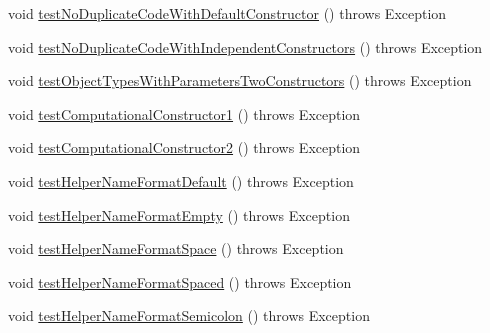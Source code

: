 \begin{DoxyCompactItemize}
\item 
void \hyperlink{classedu_1_1illinois_1_1canistelCassabanana_1_1tests_1_1RemoveDuplicateCodeInConstructorsRefactoringTests_ab173b5c78a3860d95f4ab97fdc0fef49}{testNoDuplicateCodeWithDefaultConstructor} ()  throws Exception 
\item 
void \hyperlink{classedu_1_1illinois_1_1canistelCassabanana_1_1tests_1_1RemoveDuplicateCodeInConstructorsRefactoringTests_a65fcb17a4c0e1fb24ce9bd210883a678}{testNoDuplicateCodeWithIndependentConstructors} ()  throws Exception 
\item 
void \hyperlink{classedu_1_1illinois_1_1canistelCassabanana_1_1tests_1_1RemoveDuplicateCodeInConstructorsRefactoringTests_a8ce024d895ab6486627105868561a1e3}{testObjectTypesWithParametersTwoConstructors} ()  throws Exception 
\item 
void \hyperlink{classedu_1_1illinois_1_1canistelCassabanana_1_1tests_1_1RemoveDuplicateCodeInConstructorsRefactoringTests_ae4a827bef441db2b76f74c7b2f971c0a}{testComputationalConstructor1} ()  throws Exception 
\item 
void \hyperlink{classedu_1_1illinois_1_1canistelCassabanana_1_1tests_1_1RemoveDuplicateCodeInConstructorsRefactoringTests_a5b67abcdbc9cc241b2c23944b16eafd5}{testComputationalConstructor2} ()  throws Exception 
\item 
void \hyperlink{classedu_1_1illinois_1_1canistelCassabanana_1_1tests_1_1RemoveDuplicateCodeInConstructorsRefactoringTests_a9decff2853f3b47461c29026a3b3f87d}{testHelperNameFormatDefault} ()  throws Exception 
\item 
void \hyperlink{classedu_1_1illinois_1_1canistelCassabanana_1_1tests_1_1RemoveDuplicateCodeInConstructorsRefactoringTests_a3a00394b8cf18be26c02300e2f766d10}{testHelperNameFormatEmpty} ()  throws Exception 
\item 
void \hyperlink{classedu_1_1illinois_1_1canistelCassabanana_1_1tests_1_1RemoveDuplicateCodeInConstructorsRefactoringTests_a89efd5d87b6b21592042b014c5ddf22f}{testHelperNameFormatSpace} ()  throws Exception 
\item 
void \hyperlink{classedu_1_1illinois_1_1canistelCassabanana_1_1tests_1_1RemoveDuplicateCodeInConstructorsRefactoringTests_ad5c867985f9767fcdb07efe7d3caad1d}{testHelperNameFormatSpaced} ()  throws Exception 
\item 
void \hyperlink{classedu_1_1illinois_1_1canistelCassabanana_1_1tests_1_1RemoveDuplicateCodeInConstructorsRefactoringTests_a208ee442b4a08ab1450e8a808742c1a9}{testHelperNameFormatSemicolon} ()  throws Exception 

\end{DoxyCompactItemize}
